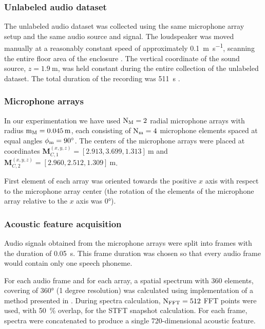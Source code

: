 \documentclass[applsci,article,submit,moreauthors,pdftex]{Definitions/mdpi}
\begin{document}
\subsubsection{Unlabeled audio dataset}
The unlabeled audio dataset was collected using the same microphone array setup and the same audio source and signal. The loudspeaker was moved manually at a reasonably constant speed of approximately \SI{0.1}{\m\per\s}, scanning the entire floor area of the enclosure . The vertical coordinate of the sound source, $ z = \SI{1.9}{\m} $, was held constant during the entire collection of the unlabeled dataset. 
The total duration of the recording was \SI{511}{\s} .

\subsubsection{Microphone arrays}
In our experimentation we have used $ \mathrm{N}_{\mathrm{M}} = 2 $ radial microphone arrays with radius $ \radius_{\arr} = \SI{0.045}{\m} $, each consisting of $ \mathrm{N}_{\mathrm{m}} = 4 $ microphone elements spaced at equal angles $ \phi_{\mathrm{m}} = \ang{90} $. The centers of the microphone arrays were placed at coordinates $ \mathbf{M}_{C,1}^{(x,y,z)} = [2.913, 3.699, 1.313]~\si{\m} $ and $ \mathbf{M}_{C,2}^{(x,y,z)} = [2.960, 2.512, 1.309]~\si{\m} $.

First element of each array was oriented towards the positive $ x $ axis with respect to the microphone array center (the rotation of the elements of the microphone array relative to the $ x $ axis was \ang{0}). 

\subsubsection{Acoustic feature acquisition}

Audio signals obtained from the microphone arrays were split into frames with the duration of \SI{0.05}{\s}. This frame duration was chosen so that every audio frame would contain only one speech phoneme.

For each audio frame and for each array, a \srpphat{} spatial spectrum with 360 elements, covering \doa{} of \ang{360} (1 degree resolution) was calculated using \pra{} \python{} implementation \cite{scheiblerPyroomacousticsPythonPackage2018a} of a method presented in \cite{dibiaseHighaccuracyLowlatencyTechnique2000}. During \srpphat{} spectra calculation, $ \mathrm{N}_{\mathrm{FFT}}{} = 512 $ FFT points were used, with \SI{50}{\percent} overlap, for the STFT snapshot calculation. For each frame, \srpphat{} spectra were concatenated to produce a single 720-dimensional acoustic feature.
\end{document}
